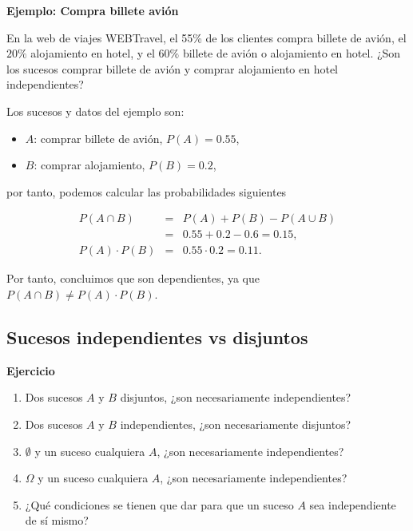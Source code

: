 \documentclass[
  letterpaper,
  DIV=11,
  numbers=noendperiod]{scrreprt}
\providecommand{\tightlist}{%
  \setlength{\itemsep}{0pt}\setlength{\parskip}{0pt}}\usepackage{longtable,booktabs,array}
\begin{document}
\textbf{Ejemplo: Compra billete avión}

En la web de viajes WEBTravel, el 55\% de los clientes compra billete de
avión, el \(20\%\) alojamiento en hotel, y el \(60\%\) billete de avión
o alojamiento en hotel. ¿Son los sucesos comprar billete de avión y
comprar alojamiento en hotel independientes?

Los sucesos y datos del ejemplo son:

\begin{itemize}
\tightlist
\item
  \(A\): comprar billete de avión, \(P(A)=0.55\),
\item
  \(B\): comprar alojamiento, \(P(B)=0.2\),
\end{itemize}

por tanto, podemos calcular las probabilidades siguientes

\begin{eqnarray*}
P(A\cap B) & = &P(A)+P(B)-P(A\cup B)\\ 
& = &0.55+0.2-0.6=0.15,\\ 
P(A)\cdot P(B) & = & 0.55\cdot 0.2=0.11.
\end{eqnarray*}

Por tanto, concluimos que son dependientes, ya que
\(P(A\cap B)\neq P(A)\cdot P(B)\).

\hypertarget{sucesos-independientes-vs-disjuntos}{%
\subsection{Sucesos independientes vs
disjuntos}\label{sucesos-independientes-vs-disjuntos}}

\textbf{Ejercicio}

\begin{enumerate}
\def\labelenumi{\arabic{enumi}.}
\tightlist
\item
  Dos sucesos \(A\) y \(B\) disjuntos, ¿son necesariamente
  independientes?
\item
  Dos sucesos \(A\) y \(B\) independientes, ¿son necesariamente
  disjuntos?
\item
  \(\emptyset\) y un suceso cualquiera \(A\), ¿son necesariamente
  independientes?
\item
  \(\Omega\) y un suceso cualquiera \(A\), ¿son necesariamente
  independientes?
\item
  ¿Qué condiciones se tienen que dar para que un suceso \(A\) sea
  independiente de sí mismo?
\end{enumerate}
\end{document}
